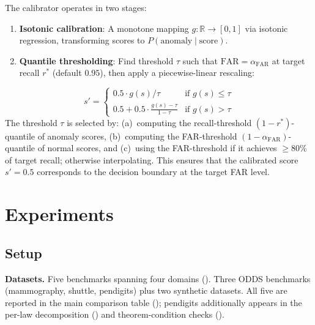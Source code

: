 \documentclass{article}
\newcommand{\R}{\mathbb{R}}
\begin{document}
The calibrator operates in two stages:
\begin{enumerate}[leftmargin=*]
  \item \textbf{Isotonic calibration}: A monotone mapping $g:\R \to [0,1]$ via isotonic regression, transforming scores to $P(\text{anomaly} \mid \text{score})$.
  \item \textbf{Quantile thresholding}: Find threshold $\tau$ such that $\text{FAR} = \alpha_{\text{FAR}}$ at target recall $r^*$ (default $0.95$), then apply a piecewise-linear rescaling:
\end{enumerate}
\begin{equation}
s' = \begin{cases}
  0.5 \cdot g(s) / \tau & \text{if } g(s) \leq \tau \\
  0.5 + 0.5 \cdot \frac{g(s) - \tau}{1 - \tau} & \text{if } g(s) > \tau
\end{cases}
\label{eq:far_calibration}
\end{equation}
The threshold $\tau$ is selected by: (a)~computing the recall-threshold $(1 - r^*)$-quantile of anomaly scores, (b)~computing the FAR-threshold $(1 - \alpha_{\text{FAR}})$-quantile of normal scores, and (c)~using the FAR-threshold if it achieves $\geq 80\%$ of target recall; otherwise interpolating. This ensures that the calibrated score $s' = 0.5$ corresponds to the decision boundary at the target FAR level.

\section{Experiments}
\label{sec:experiments}

\subsection{Setup}

\textbf{Datasets.} Five benchmarks spanning four domains (). Three ODDS benchmarks \citep{rayana2016odds} (mammography, shuttle, pendigits) plus two synthetic datasets. All five are reported in the main comparison table (); pendigits additionally appears in the per-law decomposition () and theorem-condition checks ().
\end{document}
